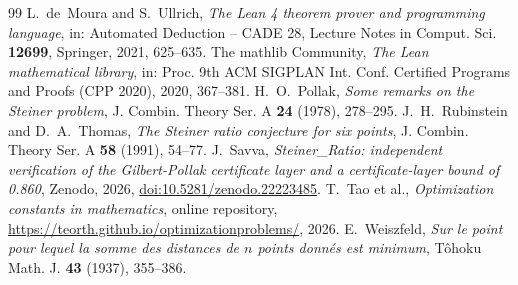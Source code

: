 \documentclass[11pt]{amsart}
\theoremstyle{definition}
\theoremstyle{remark}
\numberwithin{equation}{section}
\begin{document}
\begin{thebibliography}{99}
 L.~de~Moura and S.~Ullrich, \emph{The Lean 4 theorem prover and programming language}, in: Automated Deduction -- CADE 28, Lecture Notes in Comput. Sci. \textbf{12699}, Springer, 2021, 625--635.
 The mathlib Community, \emph{The Lean mathematical library}, in: Proc. 9th ACM SIGPLAN Int. Conf. Certified Programs and Proofs (CPP 2020), 2020, 367--381.
 H.~O.~Pollak, \emph{Some remarks on the Steiner problem}, J. Combin. Theory Ser. A \textbf{24} (1978), 278--295.
 J.~H.~Rubinstein and D.~A.~Thomas, \emph{The Steiner ratio conjecture for six points}, J. Combin. Theory Ser. A \textbf{58} (1991), 54--77.
 J.~Savva, \emph{Steiner\_Ratio: independent verification of the Gilbert-Pollak certificate layer and a certificate-layer bound of 0.860}, Zenodo, 2026, \href{https://doi.org/10.5281/zenodo.22223485}{doi:10.5281/zenodo.22223485}.
 T.~Tao et al., \emph{Optimization constants in mathematics}, online repository, \url{https://teorth.github.io/optimizationproblems/}, 2026.
 E.~Weiszfeld, \emph{Sur le point pour lequel la somme des distances de $n$ points donn\'es est minimum}, T\^ohoku Math. J. \textbf{43} (1937), 355--386.
\end{thebibliography}
\end{document}
